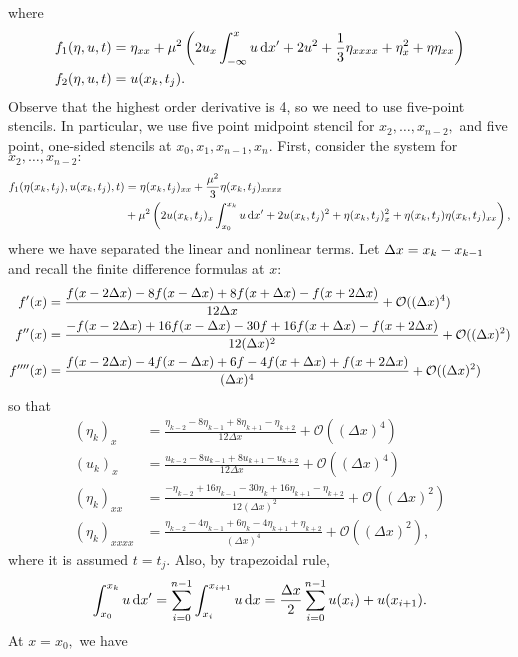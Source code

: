 \documentclass[10pt,reqno,oneside,a4paper, landscape]{article}
\begin{document}
where 
\begin{align*}
f_1(\eta, u, t) &= \eta_{xx} + \mu^2 \left( 2 u_{x} \int^{x}_{-\infty} u \,\mathrm{d} x' +2 u^2 + \frac{1}{3} \eta_{xxxx} + \eta^2_x + \eta\eta_{xx} \right) \\
f_2(\eta, u, t) &= u(x_k, t_j).
\end{align*}
Observe that the highest order derivative is 4, so we need to use five-point stencils. In particular, we use five point midpoint stencil for $x_2, \ldots, x_{n-2},$ and five point, one-sided stencils at $x_0, x_1, x_{n-1}, x_n.$ First, consider the system for $x_2, \ldots, x_{n-2}:$
\begin{align*}
f_1(\eta(x_k, t_j), u(x_k, t_j), t) &= \eta(x_k, t_j)_{xx} + \frac{\mu^2}{3} \eta(x_k, t_j)_{xxxx} \\
&+ \mu^2 \left( 2 u(x_k, t_j)_{x} \int^{x_k}_{x_0} u \,\mathrm{d} x' +2 u(x_k, t_j)^2 + \eta(x_k, t_j)^2_x + \eta(x_k, t_j)\eta(x_k, t_j)_{xx} \right),
\end{align*}
where we have separated the linear and nonlinear terms.
Let $\Delta x = x_k - x_{k-1}$ and recall the finite difference formulas at $x:$
\begin{align*}
f'(x)&= \frac{f(x- 2\Delta x ) - 8 f(x-\Delta x) + 8f(x+ \Delta x) - f(x+2\Delta x) }{12\Delta x} + \mathcal{O}((\Delta x)^4) \\
f''(x)&= \frac{-f(x- 2\Delta x ) +16 f(x-\Delta x) - 30f+16f(x+ \Delta x) - f(x+2\Delta x)}{12(\Delta x)^2} + \mathcal{O}((\Delta x)^2) \\
f''''(x)&= \frac{f(x- 2\Delta x ) -4 f(x-\Delta x) + 6f - 4f(x+ \Delta x) + f(x+2\Delta x)}{(\Delta x)^4} + \mathcal{O}((\Delta x)^2)
\end{align*}
so that 
\begin{align*}
(\eta_k)_x&= \frac{\eta_{k-2} - 8 \eta_{k-1} + 8\eta_{k+1} - \eta_{k+2}}{12\Delta x} + \mathcal{O}((\Delta x)^4) \\
(u_k)_x&= \frac{u_{k-2} - 8 u_{k-1} + 8u_{k+1} - u_{k+2} }{12\Delta x} + \mathcal{O}((\Delta x)^4) \\
(\eta_k)_{xx} &= \frac{-\eta_{k-2} +16 \eta_{k-1} - 30\eta_k+16\eta_{k+1} - \eta_{k+2}}{12(\Delta x)^2} + \mathcal{O}((\Delta x)^2) \\
(\eta_k)_{xxxx} &= \frac{\eta_{k-2} -4 \eta_{k-1} + 6\eta_k - 4\eta_{k+1} + \eta_{k+2}}{(\Delta x)^4} + \mathcal{O}((\Delta x)^2),
\end{align*}
where it is assumed $t = t_j.$ Also, by trapezoidal rule, 
\[ 
\int^{x_k}_{x_0} u \,\mathrm{d} x' = \sum_{i=0}^{n-1} \int^{x_{i+1}}_{x_{i}} u \,\mathrm{d} x = \frac{\Delta x}{2} \sum_{i=0}^{n-1} u(x_i) + u(x_{i+1}).
\]
At $x = x_0,$ we have 
\end{document}
